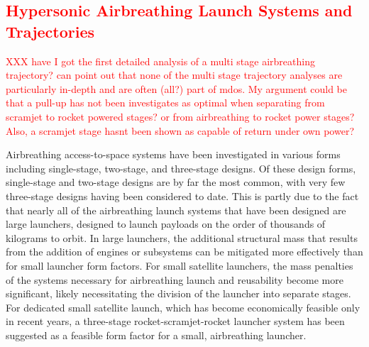   
  
  
  

   
   
   






    \textcolor{red}{
  \section{Hypersonic Airbreathing Launch Systems and Trajectories}\label{sec:AscentTrajectories}
}
\textcolor{red}{XXX have I got the first detailed analysis of a multi stage airbreathing trajectory? can point out that none of the multi stage trajectory analyses are particularly in-depth and are often (all?) part of mdos. My argument could be that a pull-up has not been investigates as optimal when separating from scramjet to rocket powered stages? or from airbreathing to rocket power stages? Also, a scramjet stage hasnt been shown as capable of return under own power?}
  
    
Airbreathing access-to-space systems have been investigated in various forms including single-stage, two-stage, and three-stage designs. 
Of these design forms, single-stage and two-stage designs are by far the most common, with very few three-stage designs having been considered to date. This is partly due to the fact that nearly all of the airbreathing launch systems that have been designed are large launchers, designed to launch payloads on the order of thousands of kilograms to orbit. In large launchers, the additional structural mass that results from the addition of engines or subsystems can be mitigated more effectively than for small launcher form factors.
For small satellite launchers, the mass penalties of the systems necessary for airbreathing launch and reusability become more significant, likely necessitating the division of the launcher into separate stages. 
For dedicated small satellite launch, which has become economically feasible only in recent years, a three-stage rocket-scramjet-rocket launcher system has been suggested as a feasible form factor for a small, airbreathing launcher\cite{Preller2017b}. 


